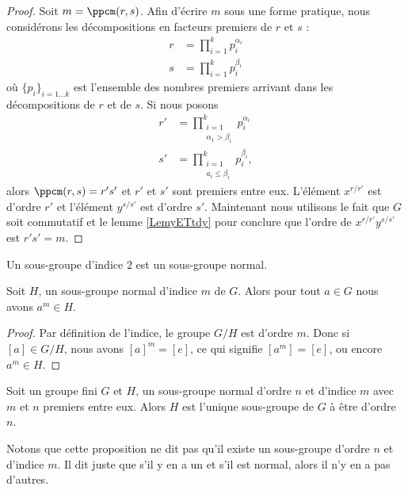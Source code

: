 \begin{proof}
    Soit \( m=\ppcm(r,s)\). Afin d'écrire \( m\) sous une forme pratique, nous considérons les décompositions en facteurs premiers de \( r\) et \( s\) :
    \begin{subequations}
        \begin{align}
            r&=\prod_{i=1}^kp_i^{\alpha_i}\\
            s&=\prod_{i=1}^kp_i^{\beta_i}
        \end{align}
    \end{subequations}
    où \( \{ p_i \}_{i=1\ldots k}\) est l'ensemble des nombres premiers arrivant dans les décompositions de \( r\) et de \( s\). Si nous posons
    \begin{subequations}
        \begin{align}
            r'&=\prod_{\substack{i=1\\\alpha_1>\beta_i}}^kp_i^{\alpha_i}\\
            s'&=\prod_{\substack{i=1\\a_i\leq \beta_i}}^kp_i^{\beta_i},
        \end{align}
    \end{subequations}
    alors \( \ppcm(r,s)=r's'\) et \( r'\) et \( s'\) sont premiers entre eux. L'élément \( x^{r/r'}\) est d'ordre \( r'\) et l'élément \( y^{s/s'}\) est d'ordre \( s'\). Maintenant nous utilisons le fait que \( G\) soit commutatif et le lemme \ref{LemyETtdy} pour conclure que l'ordre de \( x^{r/r'}y^{s/s'}\) est \( r's'=m\).
\end{proof}

\begin{lemma}    \label{LemSkIOOG}
    Un sous-groupe d'indice \( 2\) est un sous-groupe normal.
\end{lemma}

\begin{lemma}\label{PropubeiGX}
    Soit \( H\), un sous-groupe normal d'indice \( m\) de \( G\). Alors pour tout \( a\in G\) nous avons \( a^m\in H\).
\end{lemma}

\begin{proof}
    Par définition de l'indice, le groupe \( G/H\) est d'ordre \( m\). Donc si \( [a]\in G/H\), nous avons \( [a]^m=[e]\), ce qui signifie \( [a^m]=[e]\), ou encore \( a^m\in H\).
\end{proof}

\begin{proposition}
    Soit un groupe fini \( G\) et \( H\), un sous-groupe normal d'ordre \( n\) et d'indice \( m\) avec \( m\) et \( n\) premiers entre eux. Alors \( H\) est l'unique sous-groupe de \( G\) à être d'ordre \( n\).
\end{proposition}
Notons que cette proposition ne dit pas qu'il existe un sous-groupe d'ordre \( n\) et d'indice \( m\). Il dit juste que s'il y en a un et s'il est normal, alors il n'y en a pas d'autres.


